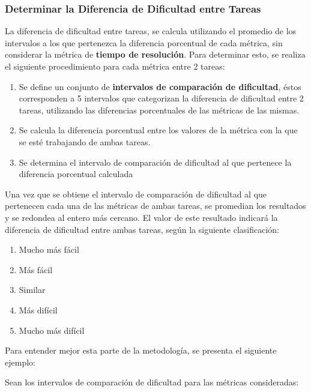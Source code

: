\documentclass[letterpaper,12pt]{article}
\begin{document}
\subsubsection{Determinar la Diferencia de Dificultad entre Tareas}

La diferencia de dificultad entre tareas, se calcula utilizando el promedio de los intervalos a los que pertenezca la diferencia porcentual de cada métrica, sin considerar la métrica de \textbf{tiempo de resolución}. Para determinar esto, se realiza el siguiente procedimiento para cada métrica entre 2 tareas:
\begin{enumerate}
  \item Se define un conjunto de \textbf{intervalos de comparación de dificultad}, éstos corresponden a 5 intervalos que categorizan la diferencia de dificultad entre 2 tareas, utilizando las diferencias porcentuales de las métricas de las mismas.
  \item Se calcula la diferencia porcentual entre los valores de la métrica con la que se esté trabajando de ambas tareas.
  \item Se determina el intervalo de comparación de dificultad al que pertenece la diferencia porcentual calculada
\end{enumerate}
Una vez que se obtiene el intervalo de comparación de dificultad al que pertenecen cada una de las métricas de ambas tareas, se promedian los resultados y se redondea al entero más cercano. El valor de este resultado indicará la diferencia de dificultad entre ambas tareas, según la siguiente clasificación:
\begin{enumerate}
  \item Mucho más fácil
  \item Más fácil
  \item Similar
  \item Más difícil
  \item Mucho más difícil
\end{enumerate}
Para entender mejor esta parte de la metodología, se presenta el siguiente ejemplo:

Sean los intervalos de comparación de dificultad para las métricas consideradas:
\end{document}
